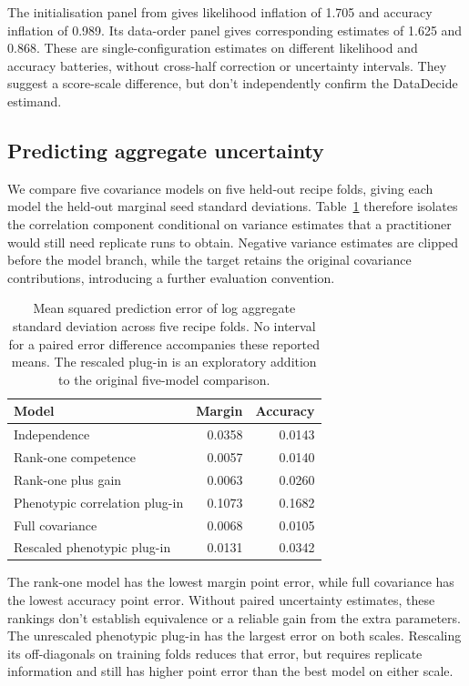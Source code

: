 \documentclass{article}
\begin{document}
The initialisation panel from \citet{heineman2025} gives likelihood inflation of 1.705 and accuracy inflation of 0.989. Its data-order panel gives corresponding estimates of 1.625 and 0.868. These are single-configuration estimates on different likelihood and accuracy batteries, without cross-half correction or uncertainty intervals. They suggest a score-scale difference, but don't independently confirm the DataDecide estimand.

\subsection{Predicting aggregate uncertainty}
We compare five covariance models on five held-out recipe folds, giving each model the held-out marginal seed standard deviations. Table~\ref{tab:prediction} therefore isolates the correlation component conditional on variance estimates that a practitioner would still need replicate runs to obtain. Negative variance estimates are clipped before the model branch, while the target retains the original covariance contributions, introducing a further evaluation convention.

\begin{table}[!htb]
\centering
\caption{Mean squared prediction error of log aggregate standard deviation across five recipe folds. No interval for a paired error difference accompanies these reported means. The rescaled plug-in is an exploratory addition to the original five-model comparison.}
\label{tab:prediction}
\small\setlength{\tabcolsep}{4pt}\renewcommand{\arraystretch}{1.12}
\begin{tabular}{lrr}
\toprule
Model & Margin & Accuracy\\
\midrule
Independence & 0.0358 & 0.0143\\
Rank-one competence & 0.0057 & 0.0140\\
Rank-one plus gain & 0.0063 & 0.0260\\
Phenotypic correlation plug-in & 0.1073 & 0.1682\\
Full covariance & 0.0068 & 0.0105\\
Rescaled phenotypic plug-in & 0.0131 & 0.0342\\
\bottomrule
\end{tabular}
\end{table}

The rank-one model has the lowest margin point error, while full covariance has the lowest accuracy point error. Without paired uncertainty estimates, these rankings don't establish equivalence or a reliable gain from the extra parameters. The unrescaled phenotypic plug-in has the largest error on both scales. Rescaling its off-diagonals on training folds reduces that error, but requires replicate information and still has higher point error than the best model on either scale.
\end{document}
